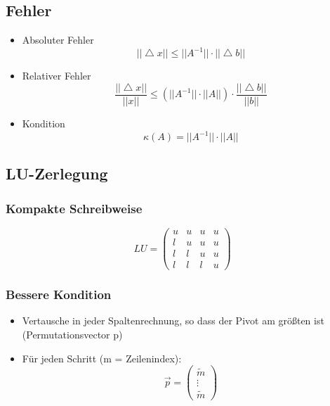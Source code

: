 \subsection{Fehler}
\begin{itemize}

	\item Absoluter Fehler
	\begin{equation*}
		||\bigtriangleup x|| \leq ||A^{-1}|| \cdot ||\bigtriangleup b||
	\end{equation*}
	
	\item Relativer Fehler
	\begin{equation*}
		\frac{||\bigtriangleup x||}{||x||} \leq (||A^{-1}|| \cdot ||A||) \cdot \frac{||\bigtriangleup b||}{||b||}
	\end{equation*}
	
	\item Kondition
	\begin{equation*}
		\kappa(A) = ||A^{-1}|| \cdot ||A||
	\end{equation*}

\end{itemize}

\subsection{LU-Zerlegung}

\subsubsection*{Kompakte Schreibweise}
\begin{displaymath}
	LU = 
	\begin{pmatrix}
		u & u & u & u \\
		l & u & u & u \\
		l & l & u & u \\
		l & l & l & u
	\end{pmatrix}
\end{displaymath}

\subsubsection*{Bessere Kondition}
\begin{itemize}

	\item Vertausche in jeder Spaltenrechnung, so dass der Pivot am größten ist (Permutationsvector p)
	
	\item Für jeden Schritt (m = Zeilenindex):
		\begin{displaymath}
			\vec{p} =
			\begin{pmatrix}
				\widetilde{m} \\
				\vdots \\
				\widetilde{m}
			\end{pmatrix}
		\end{displaymath}

\end{itemize}

